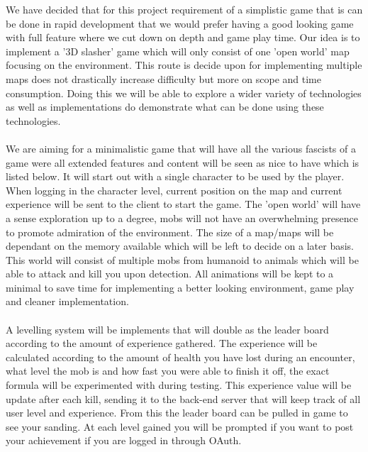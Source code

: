 \documentclass[letterpaper]{article}
\begin{document}
		\vspace{0.2in}
		
			We have decided that for this project requirement of a simplistic game that is can be done in rapid development that we would prefer having a good looking game with full feature where we cut down on depth and game play time. Our idea is to implement a '3D slasher' game which will only consist of one 'open world' map focusing on the environment. This route is decide upon for implementing multiple maps does not drastically increase difficulty but more on scope and time consumption. Doing this we will be able to explore a wider variety of technologies as well as implementations do demonstrate what can be done using these technologies. 
			\\
			\\
			We are aiming for a minimalistic game that will have all the various fascists of a game were all extended features and content will be seen as nice to have which is listed below. It will start out with a single character to be used by the player. When logging in the character level, current position on the map and current experience will be sent to the client to start the game. The 'open world' will have a sense exploration up to a degree, mobs will not have an overwhelming presence to promote admiration of the environment. The size of a map/maps will be dependant on the memory available which will be left to decide on a later basis. This world will consist of multiple mobs from humanoid to animals which will be able to attack and kill you upon detection. All animations will be kept to a minimal to save time for implementing a better looking environment, game play and cleaner implementation.
			\\
			\\
			A levelling system will be implements that will double as the leader board according to the amount of experience gathered. The experience will be calculated according to the amount of health you have lost during an encounter, what level the mob is and how fast you were able to finish it off, the exact formula will be experimented with during testing. This experience value will be update after each kill, sending it to the back-end server that will keep track of all user level and experience. From this the leader board can be pulled in game to see your sanding.  At each level gained you will be prompted if you want to post your achievement if you are logged in through OAuth.
			\\
			\\
\end{document}

